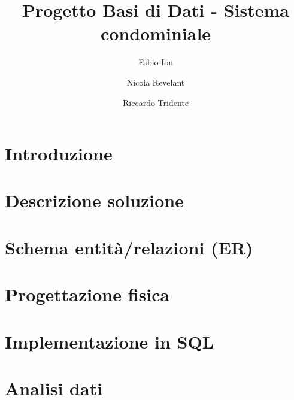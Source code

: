 \documentclass[a4paper, 11pt]{article}
\title{Progetto Basi di Dati - Sistema condominiale}
\author{
	Fabio Ion
	\and
	Nicola Revelant
	\and
	Riccardo Tridente
}
\begin{document}
\maketitle

\tableofcontents

\clearpage

\section{Introduzione}

\clearpage

\section{Descrizione soluzione}

\section{Schema entità/relazioni (ER)}





\section{Progettazione fisica}

\section{Implementazione in SQL}

\section{Analisi dati}
\end{document}
